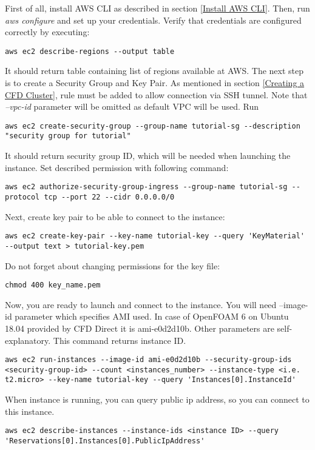 \documentclass[12pt,english]{article}
\begin{document}
First of all, install AWS CLI as described in section \ref{Install AWS CLI}. Then, run \textit{aws configure} and set up your credentials.
Verify that credentials are configured correctly by executing:
\begin{lstlisting}
aws ec2 describe-regions --output table
\end{lstlisting}
It should return table containing list of regions available at AWS.
The next step is to create a Security Group and Key Pair. As mentioned in section \ref{Creating a CFD Cluster}, rule must be added to allow connection via SSH tunnel. Note that \textit{--vpc-id} parameter will be omitted as default VPC will be used. Run
\begin{lstlisting}
aws ec2 create-security-group --group-name tutorial-sg --description "security group for tutorial"
\end{lstlisting}
It should return security group ID, which will be needed when launching the instance. Set described permission with following command:
\begin{lstlisting}
aws ec2 authorize-security-group-ingress --group-name tutorial-sg --protocol tcp --port 22 --cidr 0.0.0.0/0
\end{lstlisting}
Next, create key pair to be able to connect to the instance:
\begin{lstlisting}
aws ec2 create-key-pair --key-name tutorial-key --query 'KeyMaterial' --output text > tutorial-key.pem
\end{lstlisting}
Do not forget about changing permissions for the key file:
\begin{lstlisting}
chmod 400 key_name.pem
\end{lstlisting}
Now, you are ready to launch and connect to the instance. You will need --image-id parameter which specifies AMI used. In case of OpenFOAM 6 on Ubuntu 18.04 provided by CFD Direct it is ami-e0d2d10b. Other parameters are self-explanatory. This command returns instance ID.
\begin{lstlisting}
aws ec2 run-instances --image-id ami-e0d2d10b --security-group-ids <security-group-id> --count <instances_number> --instance-type <i.e. t2.micro> --key-name tutorial-key --query 'Instances[0].InstanceId'
\end{lstlisting}
When instance is running, you can query public ip address, so you can connect to this instance.
\begin{lstlisting}
aws ec2 describe-instances --instance-ids <instance ID> --query 'Reservations[0].Instances[0].PublicIpAddress'
\end{lstlisting}
\end{document}
